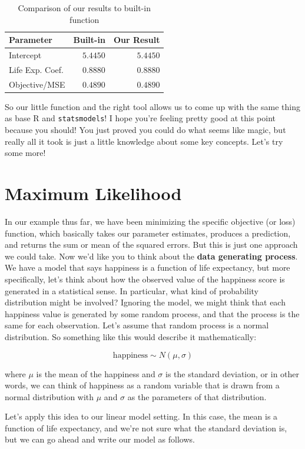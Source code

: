 \documentclass[
  letterpaper,
]{krantz}
\begin{document}
\hypertarget{tbl-r-optim-ols}{}
\begin{longtable}{lrr}
\caption{\label{tbl-r-optim-ols}Comparison of our results to built-in function }\tabularnewline

\toprule
Parameter & Built-in & Our Result \\ 
\midrule
Intercept & $5.4450$ & $5.4450$ \\ 
Life Exp. Coef. & $0.8880$ & $0.8880$ \\ 
Objective/MSE & $0.4890$ & $0.4890$ \\ 
\bottomrule
\end{longtable}

So our little function and the right tool allows us to come up with the
same thing as base R and \texttt{statsmodels}! I hope you're feeling
pretty good at this point because you should! You just proved you could
do what seems like magic, but really all it took is just a little
knowledge about some key concepts. Let's try some more!

\section{Maximum Likelihood}\label{maximum-likelihood}

In our example thus far, we have been minimizing the specific objective
(or loss) function, which basically takes our parameter estimates,
produces a prediction, and returns the sum or mean of the squared
errors. But this is just one approach we could take. Now we'd like you
to think about the \textbf{data generating process}. We have a model
that says happiness is a function of life expectancy, but more
specifically, let's think about how the observed value of the happiness
score is generated in a statistical sense. In particular, what kind of
probability distribution might be involved? Ignoring the model, we might
think that each happiness value is generated by some random process, and
that the process is the same for each observation. Let's assume that
random process is a normal distribution. So something like this would
describe it mathematically:

\[
\textrm{happiness} \sim N(\mu, \sigma)
\]

where \(\mu\) is the mean of the happiness and \(\sigma\) is the
standard deviation, or in other words, we can think of happiness as a
random variable that is drawn from a normal distribution with \(\mu\)
and \(\sigma\) as the parameters of that distribution.

Let's apply this idea to our linear model setting. In this case, the
mean is a function of life expectancy, and we're not sure what the
standard deviation is, but we can go ahead and write our model as
follows.
\end{document}
